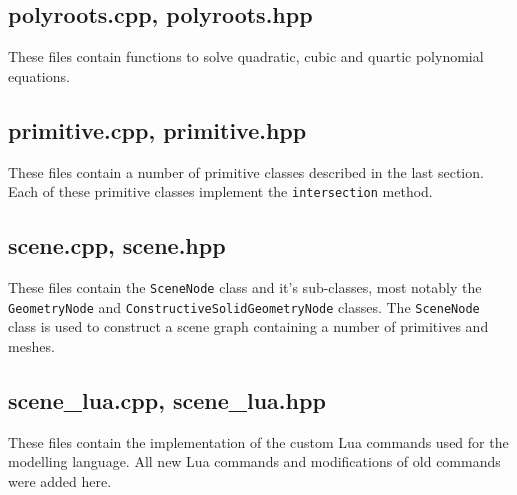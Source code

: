 \subsection*{polyroots.cpp, polyroots.hpp}
These files contain functions to solve quadratic, cubic and quartic polynomial
equations.

\subsection*{primitive.cpp, primitive.hpp}
These files contain a number of primitive classes described in the last section.
Each of these primitive classes implement the \verb|intersection| method.

\subsection*{scene.cpp, scene.hpp}
These files contain the \verb|SceneNode| class and it's sub-classes, most 
notably the \verb|GeometryNode| and \verb|ConstructiveSolidGeometryNode| 
classes. The \verb|SceneNode| class is used to construct a scene graph
containing a number of primitives and meshes.

\subsection*{scene_lua.cpp, scene_lua.hpp}
These files contain the implementation of the custom Lua commands used for the
modelling language. All new Lua commands and modifications of old commands were
added here.

